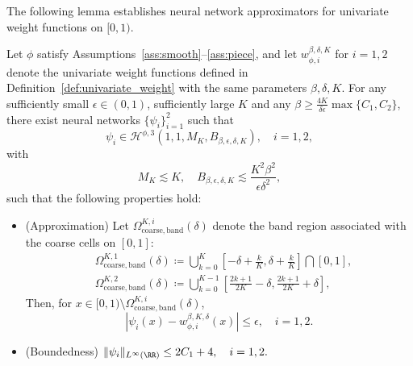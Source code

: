 \documentclass[11pt]{article}
\begin{document}
The following lemma establishes neural network approximators for univariate weight functions on $[0, 1)$.
\begin{lemma}
    \label{lem:app_wieght_band}
    Let $\phi$ satisfy Assumptions~\ref{ass:smooth}--\ref{ass:piece}, and let $w_{\phi,i}^{\beta, \delta, K}$ for $i=1,2$ denote the univariate weight functions defined in Definition~\ref{def:univariate_weight} with the same parameters $\beta, \delta, K$. For any sufficiently small $\epsilon \in (0,1)$, sufficiently large $K$ and any $\beta \geq \frac{4K}{\delta \epsilon} \max \{C_1, C_2\}$, there exist neural networks $\{\psi_i\}_{i=1}^2$ such that
    \begin{equation*}
        \psi_i \in \mathcal{H}^{\phi,3}(1,1,M_{K},B_{\beta, \epsilon, \delta, K}), \quad i = 1 , 2,
    \end{equation*}
    with 
    \begin{equation}
        M_{K} \lesssim K, \quad B_{\beta, \epsilon, \delta, K} \lesssim \frac{K^2 \beta^2}{\epsilon \delta^2},
        \label{eq:width-norm-app-weight-band}
    \end{equation}
    such that the following properties hold:
    \begin{itemize}
        \item (Approximation) Let $\Omega_{\mathrm{coarse,band}}^{K,i}({\delta})$ denote the band region associated with the coarse cells on $[0,1]$:
        \begin{equation*}
            \begin{aligned}
                 & \Omega_{\mathrm{coarse,band}}^{K,1}({\delta}) \coloneqq  \bigcup_{k=0}^K \left[ -{\delta}+\frac{k}{K},{\delta} + \frac{k}{K} \right] \bigcap [0,1], \\
                 & \Omega_{\mathrm{coarse,band}}^{K,2}({\delta}) \coloneqq  \bigcup_{k=0}^{K-1} \left[\frac{2k+1}{2K}  - {\delta}, \frac{2k+1}{2K} + {\delta}\right],
            \end{aligned}
        \end{equation*}
        Then, for $x \in [0,1) \setminus \Omega_{\mathrm{coarse,band}}^{K,i}({\delta})$,
        \begin{equation*}
            |\psi_i(x) - w_{\phi,i}^{\beta, K, \delta} (x)| \leq \epsilon,  \quad i = 1, 2.
        \end{equation*}
        \item (Boundedness) $\|\psi_i\|_{L^{\infty}(\RR)} \leq 2C_1+4 , \quad i = 1,2.$
    \end{itemize}
\end{lemma}
\end{document}

